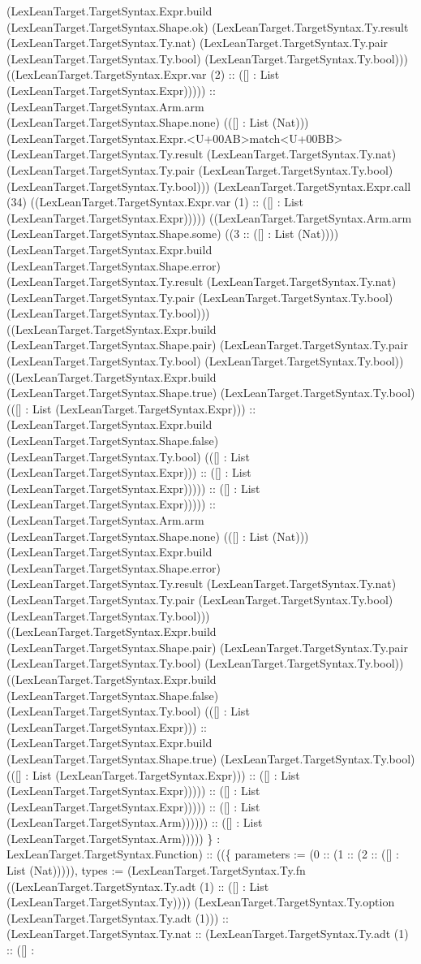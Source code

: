 \documentclass[11pt]{article}
\begin{document}
(LexLeanTarget.TargetSyntax.Expr.build (LexLeanTarget.TargetSyntax.Shape.ok) (LexLeanTarget.TargetSyntax.Ty.result (LexLeanTarget.TargetSyntax.Ty.nat) (LexLeanTarget.TargetSyntax.Ty.pair (LexLeanTarget.TargetSyntax.Ty.bool) (LexLeanTarget.TargetSyntax.Ty.bool))) ((LexLeanTarget.TargetSyntax.Expr.var (2) :: ([] : List (LexLeanTarget.TargetSyntax.Expr))))) :: (LexLeanTarget.TargetSyntax.Arm.arm (LexLeanTarget.TargetSyntax.Shape.none) (([] : List (Nat))) (LexLeanTarget.TargetSyntax.Expr.<U+00AB>match<U+00BB> (LexLeanTarget.TargetSyntax.Ty.result (LexLeanTarget.TargetSyntax.Ty.nat) (LexLeanTarget.TargetSyntax.Ty.pair (LexLeanTarget.TargetSyntax.Ty.bool) (LexLeanTarget.TargetSyntax.Ty.bool))) (LexLeanTarget.TargetSyntax.Expr.call (34) ((LexLeanTarget.TargetSyntax.Expr.var (1) :: ([] : List (LexLeanTarget.TargetSyntax.Expr))))) ((LexLeanTarget.TargetSyntax.Arm.arm (LexLeanTarget.TargetSyntax.Shape.some) ((3 :: ([] : List (Nat)))) (LexLeanTarget.TargetSyntax.Expr.build (LexLeanTarget.TargetSyntax.Shape.error) (LexLeanTarget.TargetSyntax.Ty.result (LexLeanTarget.TargetSyntax.Ty.nat) (LexLeanTarget.TargetSyntax.Ty.pair (LexLeanTarget.TargetSyntax.Ty.bool) (LexLeanTarget.TargetSyntax.Ty.bool))) ((LexLeanTarget.TargetSyntax.Expr.build (LexLeanTarget.TargetSyntax.Shape.pair) (LexLeanTarget.TargetSyntax.Ty.pair (LexLeanTarget.TargetSyntax.Ty.bool) (LexLeanTarget.TargetSyntax.Ty.bool)) ((LexLeanTarget.TargetSyntax.Expr.build (LexLeanTarget.TargetSyntax.Shape.true) (LexLeanTarget.TargetSyntax.Ty.bool) (([] : List (LexLeanTarget.TargetSyntax.Expr))) :: (LexLeanTarget.TargetSyntax.Expr.build (LexLeanTarget.TargetSyntax.Shape.false) (LexLeanTarget.TargetSyntax.Ty.bool) (([] : List (LexLeanTarget.TargetSyntax.Expr))) :: ([] : List (LexLeanTarget.TargetSyntax.Expr))))) :: ([] : List (LexLeanTarget.TargetSyntax.Expr))))) :: (LexLeanTarget.TargetSyntax.Arm.arm (LexLeanTarget.TargetSyntax.Shape.none) (([] : List (Nat))) (LexLeanTarget.TargetSyntax.Expr.build (LexLeanTarget.TargetSyntax.Shape.error) (LexLeanTarget.TargetSyntax.Ty.result (LexLeanTarget.TargetSyntax.Ty.nat) (LexLeanTarget.TargetSyntax.Ty.pair (LexLeanTarget.TargetSyntax.Ty.bool) (LexLeanTarget.TargetSyntax.Ty.bool))) ((LexLeanTarget.TargetSyntax.Expr.build (LexLeanTarget.TargetSyntax.Shape.pair) (LexLeanTarget.TargetSyntax.Ty.pair (LexLeanTarget.TargetSyntax.Ty.bool) (LexLeanTarget.TargetSyntax.Ty.bool)) ((LexLeanTarget.TargetSyntax.Expr.build (LexLeanTarget.TargetSyntax.Shape.false) (LexLeanTarget.TargetSyntax.Ty.bool) (([] : List (LexLeanTarget.TargetSyntax.Expr))) :: (LexLeanTarget.TargetSyntax.Expr.build (LexLeanTarget.TargetSyntax.Shape.true) (LexLeanTarget.TargetSyntax.Ty.bool) (([] : List (LexLeanTarget.TargetSyntax.Expr))) :: ([] : List (LexLeanTarget.TargetSyntax.Expr))))) :: ([] : List (LexLeanTarget.TargetSyntax.Expr))))) :: ([] : List (LexLeanTarget.TargetSyntax.Arm)))))) :: ([] : List (LexLeanTarget.TargetSyntax.Arm))))) \} : LexLeanTarget.TargetSyntax.Function) :: ((\{ parameters := (0 :: (1 :: (2 :: ([] : List (Nat))))), types := (LexLeanTarget.TargetSyntax.Ty.fn ((LexLeanTarget.TargetSyntax.Ty.adt (1) :: ([] : List (LexLeanTarget.TargetSyntax.Ty)))) (LexLeanTarget.TargetSyntax.Ty.option (LexLeanTarget.TargetSyntax.Ty.adt (1))) :: (LexLeanTarget.TargetSyntax.Ty.nat :: (LexLeanTarget.TargetSyntax.Ty.adt (1) :: ([] : 
\end{document}
